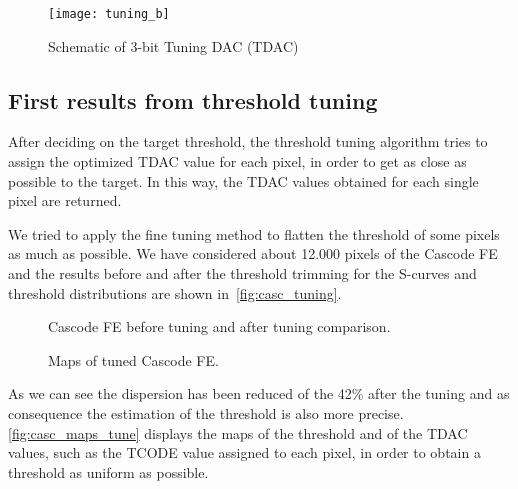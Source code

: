 \begin{figure}
\centering
\texttt{[image: tuning\_b]}
\caption{Schematic of 3-bit Tuning DAC (TDAC)}
\label{fig:tdac}
\end{figure}


\subsection{First results from threshold tuning}


After deciding on the target threshold, the threshold tuning algorithm tries to assign the optimized TDAC value for each pixel, in order to get as close as possible to the target. In this way, the TDAC values obtained for each single pixel are returned.

We tried to apply the fine tuning method to flatten the threshold of some pixels as much as possible. We have considered about 12.000 pixels of the Cascode FE and the results before and after the threshold trimming for the S-curves and threshold distributions are shown in~\autoref{fig:casc_tuning}.


\begin{figure}[h!]
\centering
{}
\caption{Cascode FE before tuning and after tuning comparison.}
\label{fig:casc_tuning}
\end{figure}

\begin{figure}[h!]
\centering
{}\quad
{}\quad
\caption{Maps of tuned Cascode FE.}
\label{fig:casc_maps_tune}
\end{figure}

As we can see the dispersion has been reduced of the 42\% after the tuning and as consequence the estimation of the threshold is also more precise. \autoref{fig:casc_maps_tune} displays the maps of the threshold and of the TDAC values, such as the TCODE value assigned to each pixel, in order to obtain a threshold as uniform as possible. \\





